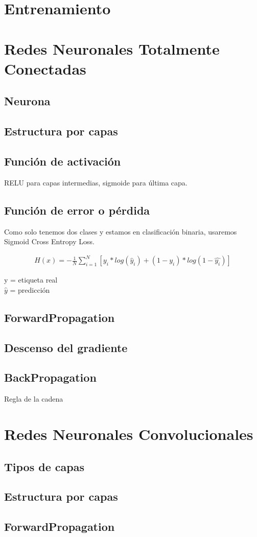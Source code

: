 \section{Entrenamiento}

\section{Redes Neuronales Totalmente Conectadas}

\subsection{Neurona}
\subsection{Estructura por capas}
\subsection{Función de activación}

RELU para capas intermedias, sigmoide para última capa.

\subsection{Función de error o pérdida}

Como solo tenemos dos clases y estamos en clasificación binaria, usaremos Sigmoid Cross Entropy Loss.

\begin{gather}
   H(x) = - \frac{1}{N} \sum_{i=1}^{N}  [y_i * log( \hat{y}_i) + (1-y_i)*log(1-\hat{y_i})]
\end{gather}

y = etiqueta real \\
$\hat{y}$ = predicción 

\subsection{ForwardPropagation}
\subsection{Descenso del gradiente}
\subsection{BackPropagation}
Regla de la cadena

\section{Redes Neuronales Convolucionales}

\subsection{Tipos de capas}

\subsection{Estructura por capas}

\subsection{ForwardPropagation}
